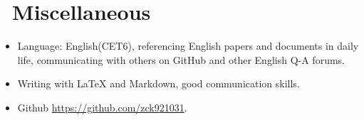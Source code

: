 \documentclass{resume}
\begin{document}
\section{\faInfo\ Miscellaneous}
\begin{itemize}[parsep=0.5ex]
  \item Language: English(CET6), referencing English papers and documents in daily life, communicating with others on GitHub and other English Q-A forums.
  \item Writing with LaTeX and Markdown, good communication skills.
  \item \faGithub Github \href{https://github.com/zck921031}{https://github.com/zck921031}.
\end{itemize}

%
%
\end{document}
